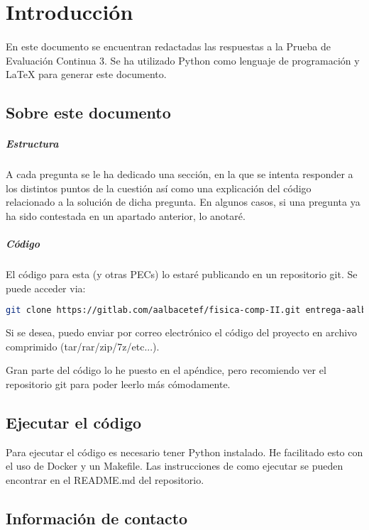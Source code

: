 %
%

\section{Introducción}

\paragraph{}
En este documento se encuentran redactadas las respuestas a la Prueba de Evaluación Continua 3. Se ha utilizado Python como lenguaje de programación y LaTeX para generar este documento.

\subsection{Sobre este documento}

\subparagraph{Estructura}
A cada pregunta se le ha dedicado una sección, en la que se intenta responder a los distintos puntos de la cuestión así como una explicación del código relacionado a la solución de dicha pregunta. En algunos casos, si una pregunta ya ha sido contestada en un apartado anterior, lo anotaré. 

\subparagraph{Código}
El código para esta (y otras PECs) lo estaré publicando en un repositorio git. Se puede acceder via:

\begin{lstlisting}[language=bash]
	git clone https://gitlab.com/aalbacetef/fisica-comp-II.git entrega-aalbacetef-fc-ii
\end{lstlisting}


Si se desea, puedo enviar por correo electrónico el código del proyecto en archivo comprimido (tar/rar/zip/7z/etc...).

Gran parte del código lo he puesto en el apéndice, pero recomiendo ver el repositorio git para poder leerlo más cómodamente.


\subsection{Ejecutar el código}

Para ejecutar el código es necesario tener Python instalado. He facilitado esto con el uso de Docker y un Makefile. Las instrucciones de como ejecutar se pueden encontrar en el README.md del repositorio.

\subsection{Información de contacto}


